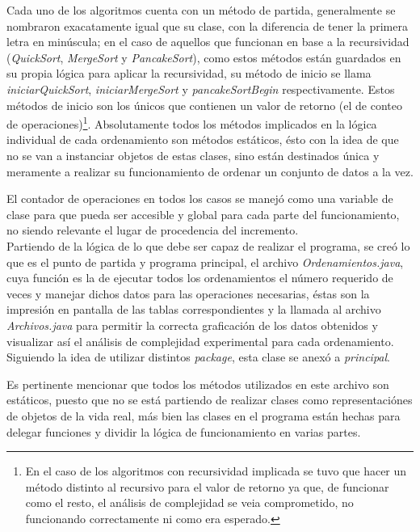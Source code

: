 \documentclass[a4paper,12pt]{article}
\begin{document}
Cada uno de los algoritmos cuenta con un método de partida, generalmente se nombraron exacatamente igual que su clase, con la diferencia de tener la primera letra en minúscula; en el caso de aquellos que funcionan en base a la recursividad (\textit{QuickSort}, \textit{MergeSort} y \textit{PancakeSort}), como estos métodos están guardados en su propia lógica para aplicar la recursividad, su método de inicio se llama \textit{iniciarQuickSort}, \textit{iniciarMergeSort} y \textit{pancakeSortBegin} respectivamente. Estos métodos de inicio son los únicos que contienen un valor de retorno (el de conteo de operaciones)\footnote{En el caso de los algoritmos con recursividad implicada se tuvo que hacer un método distinto al recursivo para el valor de retorno ya que, de funcionar como el resto, el análisis de complejidad se veia comprometido, no funcionando correctamente ni como era esperado.}. Absolutamente todos los métodos implicados en la lógica individual de cada ordenamiento son métodos estáticos, ésto con la idea de que no se van a instanciar objetos de estas clases, sino están destinados única y meramente a realizar su funcionamiento de ordenar un conjunto de datos a la vez.

El contador de operaciones en todos los casos se manejó como una variable de clase para que pueda ser accesible y global para cada parte del funcionamiento, no siendo relevante el lugar de procedencia del incremento.\\

Partiendo de la lógica de lo que debe ser capaz de realizar el programa, se creó lo que es el punto de partida y programa principal, el archivo \textit{Ordenamientos.java}, cuya función es la de ejecutar todos los ordenamientos el número requerido de veces y manejar dichos datos para las operaciones necesarias, éstas son la impresión en pantalla de las tablas correspondientes y la llamada al archivo \textit{Archivos.java} para permitir la correcta graficación de los datos obtenidos y visualizar así el análisis de complejidad experimental para cada ordenamiento. Siguiendo la idea de utilizar distintos \textit{package}, esta clase se anexó a \textit{principal}.

Es pertinente mencionar que todos los métodos utilizados en este archivo son estáticos, puesto que no se está partiendo de realizar clases como representaciónes de objetos de la vida real, más bien las clases en el programa están hechas para delegar funciones y dividir la lógica de funcionamiento en varias partes.\\
\end{document}

